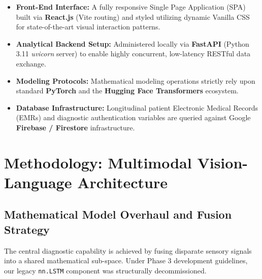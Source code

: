 \documentclass[11pt,a4paper]{article}
\begin{document}
\begin{table}[htbp]
\centering
{}
\caption{Evolution of the MediSim technology stack from initial proposal to functional deployment.}
\label{tab:tech_stack}
\end{table}

\begin{itemize}
    \item \textbf{Front-End Interface:} A fully responsive Single Page Application (SPA) built via \textbf{React.js} (Vite routing) and styled utilizing dynamic Vanilla CSS for state-of-the-art visual interaction patterns.
    \item \textbf{Analytical Backend Setup:} Administered locally via \textbf{FastAPI} (Python 3.11 \textit{uvicorn} server) to enable highly concurrent, low-latency RESTful data exchange.
    \item \textbf{Modeling Protocols:} Mathematical modeling operations strictly rely upon standard \textbf{PyTorch} and the \textbf{Hugging Face Transformers} ecosystem.
    \item \textbf{Database Infrastructure:} Longitudinal patient Electronic Medical Records (EMRs) and diagnostic authentication variables are queried against Google \textbf{Firebase / Firestore} infrastructure.
\end{itemize}


\section{Methodology: Multimodal Vision-Language Architecture}

\subsection{Mathematical Model Overhaul and Fusion Strategy}
The central diagnostic capability is achieved by fusing disparate sensory signals into a shared mathematical sub-space. Under Phase 3 development guidelines, our legacy \texttt{nn.LSTM} component was structurally decommissioned.
\end{document}
